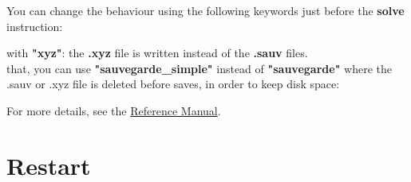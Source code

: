 You can change the behaviour using the following keywords just before the \textbf{solve} instruction:

    \begin{center}
    \end{center}

with
\textbf{"xyz"}: the \textbf{.xyz} file is written instead of the \textbf{.sauv} files.\\

\Note that, you can use \textbf{"sauvegarde\_simple"} instead of \textbf{"sauvegarde"} where the .sauv or .xyz file is deleted before saves, in order to keep disk space:
    \begin{center}
    \end{center}

For more details, see the \href{TRUST_Reference_Manual.pdf\#Pbbase}{\trust Reference Manual}. \\




\section{Restart}

